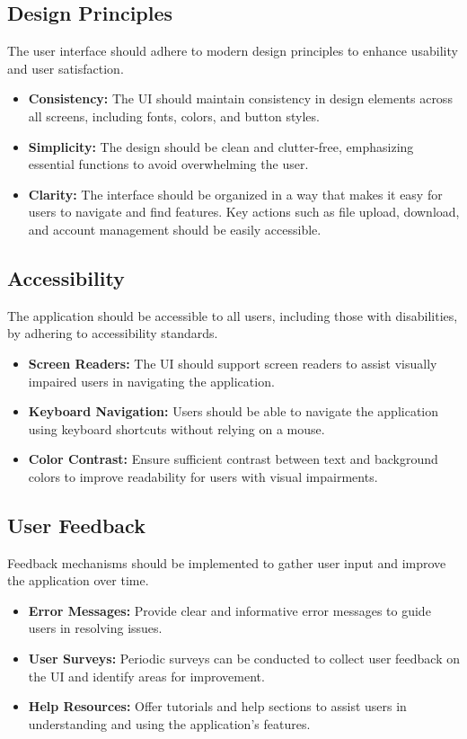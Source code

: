 \documentclass[12pt,a4paper]{report}
\begin{document}
   \subsection{Design Principles}
   The user interface should adhere to modern design principles to enhance usability and user satisfaction.
   \begin{itemize}
       \item \textbf{Consistency:} The UI should maintain consistency in design elements across all screens, including fonts, colors, and button styles.
       \item \textbf{Simplicity:} The design should be clean and clutter-free, emphasizing essential functions to avoid overwhelming the user.
       \item \textbf{Clarity:} The interface should be organized in a way that makes it easy for users to navigate and find features. Key actions such as file upload, download, and account management should be easily accessible.
   \end{itemize}
   
   \subsection{Accessibility}
   The application should be accessible to all users, including those with disabilities, by adhering to accessibility standards.
   \begin{itemize}
       \item \textbf{Screen Readers:} The UI should support screen readers to assist visually impaired users in navigating the application.
       \item \textbf{Keyboard Navigation:} Users should be able to navigate the application using keyboard shortcuts without relying on a mouse.
       \item \textbf{Color Contrast:} Ensure sufficient contrast between text and background colors to improve readability for users with visual impairments.
   \end{itemize}
   
   \subsection{User Feedback}
   Feedback mechanisms should be implemented to gather user input and improve the application over time.
   \begin{itemize}
       \item \textbf{Error Messages:} Provide clear and informative error messages to guide users in resolving issues.
       \item \textbf{User Surveys:} Periodic surveys can be conducted to collect user feedback on the UI and identify areas for improvement.
       \item \textbf{Help Resources:} Offer tutorials and help sections to assist users in understanding and using the application's features.
   \end{itemize}
   
\end{document}
